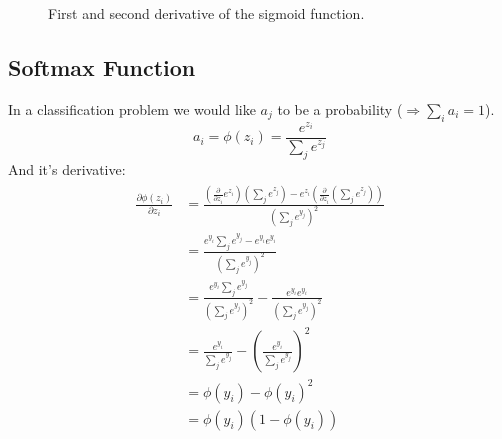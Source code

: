 \begin{figure}
\centering
{}
\caption{First and second derivative of the sigmoid function.}
\end{figure}

\subsection{Softmax Function}
In a classification problem we would like $a_j$ to be a probability ($\Rightarrow \sum_i a_i = 1$). %
\begin{equation}\label{ed:softmax}
a_i = \phi(z_i) = \frac{e^{z_i}}{\sum_j e^{z_j}}
\end{equation}
And it's derivative:
\begin{align}
\begin{split}\label{ed:softmax_derivative}
\frac{\partial \phi(z_i)}{\partial z_i}
&= \frac{\left(\frac{\partial}{\partial z_i} e^{z_i}\right)(\sum_j e^{z_j}) - e^{z_i} \left(\frac{\partial}{\partial z_i}(\sum_j e^{z_j})\right)}{(\sum_j e^{y_j})^2}\\
&= \frac{e^{y_i} \sum_j e^{y_j} - e^{y_i} e^{y_i}}{(\sum_j e^{y_j})^2}\\
&= \frac{e^{y_i} \sum_j e^{y_j}}{(\sum_j e^{y_j})^2} - \frac{e^{y_i} e^{y_i}}{(\sum_j e^{y_j})^2}\\
&= \frac{e^{y_i}}{\sum_j e^{y_j}} - \left(\frac{e^{y_i}}{\sum_j e^{y_j}}\right)^2\\
&= \phi(y_i) - \phi(y_i)^2\\
&= \phi(y_i) (1 - \phi(y_i))
\end{split}
\end{align}

